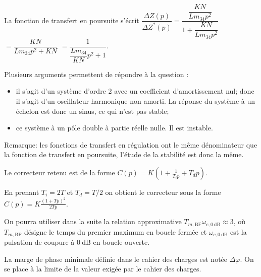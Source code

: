 \ifprof
\begin{corrige}
La fonction de transfert en poursuite s'écrit $\dfrac{\Delta Z(p)}{\Delta Z^*(p)}=\dfrac{\dfrac{KN}{Lm_{34}p^2}}{1+\dfrac{KN}{Lm_{34}p^2}}$
 $=\dfrac{KN}{Lm_{34}p^2+KN}$
  $=\dfrac{1}{\dfrac{Lm_{34}}{KN}p^2+1}$.

Plusieurs arguments permettent de répondre à la question : 
\begin{itemize}
\item il s'agit d'un système d'ordre 2 avec un coefficient d'amortissement nul; donc il s'agit d'un oscillateur harmonique non amorti. La réponse du système à un échelon est donc un sinus, ce qui n'est pas stable;
\item ce système à un pôle double à partie réelle nulle. Il est instable. 
\end{itemize}

Remarque: les fonctions de transfert en régulation ont le même dénominateur que la fonction de transfert en poursuite, l'étude de la stabilité est donc la même.

\end{corrige}
\else
\fi
\ifprof
\else

Le correcteur retenu est de la forme
$
C(p)=K\left(1+\frac{1}{T_{i} p}+T_{d} p\right) .
$

En prenant $T_{i}=2 T$ et $T_{d}=T / 2$ on obtient le correcteur sous la forme
$
C(p)=K \frac{(1+T p)^{2}}{2 T p} .
$

On pourra utiliser dans la suite la relation approximative $T_{m, \mathrm{BF}} \omega_{c, 0 \mathrm{~dB}} \approx 3$, où $T_{m, \mathrm{BF}}$ désigne le temps du premier maximum en boucle fermée et $\omega_{c, 0 \mathrm{~dB}}$ est la pulsation de coupure à $0 \mathrm{~dB}$ en boucle ouverte.

La marge de phase minimale définie dans le cahier des charges est notée $\Delta \varphi$. On se place à la limite de la valeur exigée par le cahier des charges.
\fi

